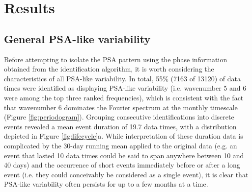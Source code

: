 
\section{Results}

\subsection{General PSA-like variability}

Before attempting to isolate the PSA pattern using the phase information obtained from the identification algorithm, it is worth considering the characteristics of all PSA-like variability. In total, 55\% (7163 of 13120) of data times were identified as displaying PSA-like variability (i.e. wavenumber 5 and 6 were among the top three ranked frequencies), which is consistent with the fact that wavenumber 6 dominates the Fourier spectrum at the monthly timescale (Figure \ref{fig:periodogram}). Grouping consecutive identifications into discrete events revealed a mean event duration of 19.7 data times, with a distribution depicted in Figure \ref{fig:lifecycle}a. While interpretation of these duration data is complicated by the 30-day running mean applied to the original data (e.g. an event that lasted 10 data times could be said to span anywhere between 10 and 40 days) and the occurrence of short events immediately before or after a long event (i.e. they could conceivably be considered as a single event), it is clear that PSA-like variability often persists for up to a few months at a time.     

